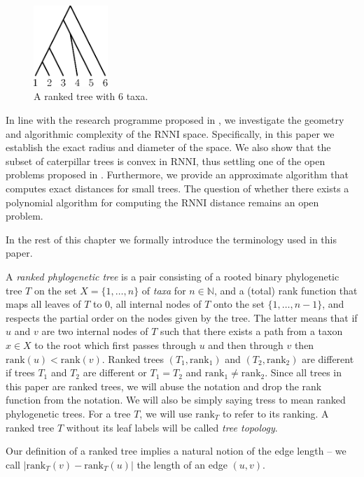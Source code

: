 \documentclass{amsart}
\newcommand{\rank}{\mathrm{rank}}
\newcommand{\rnni}{\mathrm{RNNI}}
\begin{document}
\begin{figure}[H]
\centering
\includegraphics[width=0.25\textwidth]{ranked_tree}
\vspace{12pt}
\caption{A ranked tree with $6$ taxa.}
\label{fig:ranked_tree}
\end{figure}

In line with the research programme proposed in \autocite{Gavryushkin2018-ol}, we investigate the geometry and algorithmic complexity of the $\rnni$ space.
Specifically, in this paper we establish the exact radius and diameter of the space.
We also show that the subset of caterpillar trees is convex in $\rnni$, thus settling one of the open problems proposed in \autocite{Gavryushkin2018-ol}.
Furthermore, we provide an approximate algorithm that computes exact distances for small trees.
The question of whether there exists a polynomial algorithm for computing the $\rnni$ distance remains an open problem.

In the rest of this chapter we formally introduce the terminology used in this paper.

A \emph{ranked phylogenetic tree} is a pair consisting of a rooted binary phylogenetic tree $T$ on the set $X = \{1, \ldots, n\}$ of \emph{taxa} for $n \in \mathbb N$, and a (total) rank function that maps all leaves of $T$ to $0$, all internal nodes of $T$ onto the set $\{1, \ldots, n-1\}$, and respects the partial order on the nodes given by the tree.
The latter means that if $u$ and $v$ are two internal nodes of $T$ such that there exists a path from a taxon $x \in X$ to the root which first passes through $u$ and then through $v$ then $\rank(u) < \rank(v)$.
Ranked trees $(T_1, \rank_1)$ and $(T_2, \rank_2)$ are different if trees $T_1$ and $T_2$ are different or $T_1 = T_2$ and $\rank_1 \neq \rank_2$.
Since all trees in this paper are ranked trees, we will abuse the notation and drop the rank function from the notation.
We will also be simply saying tress to mean ranked phylogenetic trees.
For a tree $T$, we will use $\rank_T$ to refer to its ranking.
A ranked tree $T$ without its leaf labels will be called \emph{tree topology}.

Our definition of a ranked tree implies a natural notion of the edge length -- we call $|\rank_T(v) - \rank_T(u)|$ the length of an edge $(u, v)$.
\end{document}
